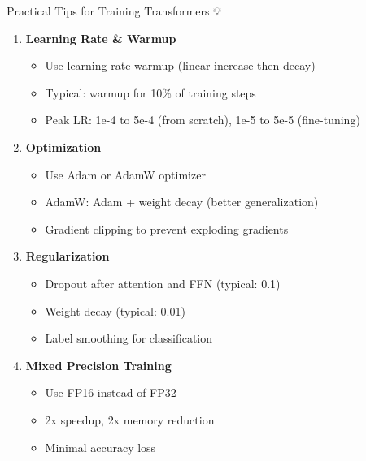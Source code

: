 \documentclass[aspectratio=169]{beamer}
\begin{document}
\begin{frame}[shrink=10]{Practical Tips for Training Transformers 💡}
\begin{enumerate}\setlength{\itemsep}{0pt}
    \item \textbf{Learning Rate \& Warmup}
    \begin{itemize}\setlength{\itemsep}{0pt}
        \item Use learning rate warmup (linear increase then decay)
        \item Typical: warmup for 10\% of training steps
        \item Peak LR: 1e-4 to 5e-4 (from scratch), 1e-5 to 5e-5 (fine-tuning)
    \end{itemize}

    \vspace{0.5em}

    \item \textbf{Optimization}
    \begin{itemize}\setlength{\itemsep}{0pt}
        \item Use Adam or AdamW optimizer
        \item AdamW: Adam + weight decay (better generalization)
        \item Gradient clipping to prevent exploding gradients
    \end{itemize}

    \vspace{0.5em}

    \item \textbf{Regularization}
    \begin{itemize}\setlength{\itemsep}{0pt}
        \item Dropout after attention and FFN (typical: 0.1)
        \item Weight decay (typical: 0.01)
        \item Label smoothing for classification
    \end{itemize}

    \vspace{0.5em}

    \item \textbf{Mixed Precision Training}
    \begin{itemize}\setlength{\itemsep}{0pt}
        \item Use FP16 instead of FP32
        \item 2x speedup, 2x memory reduction
        \item Minimal accuracy loss
    \end{itemize}
\end{enumerate}
\end{frame}
\end{document}

